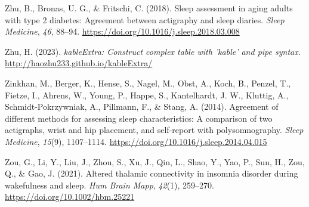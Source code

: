 \documentclass[
]{article}
\newlength{\cslhangindent}
\newenvironment{CSLReferences}[2] %
 {\begin{list}{}{%
  \setlength{\itemindent}{0pt}
  \setlength{\leftmargin}{0pt}
  \setlength{\parsep}{0pt}
  \ifodd #1
   \setlength{\leftmargin}{\cslhangindent}
   \setlength{\itemindent}{-1\cslhangindent}
  \fi
  \setlength{\itemsep}{#2\baselineskip}}}
 {\end{list}}
\begin{document}
\begin{CSLReferences}{1}{0}
Zhu, B., Bronas, U. G., \& Fritschi, C. (2018). Sleep assessment in aging adults with type 2 diabetes: Agreement between actigraphy and sleep diaries. \emph{Sleep Medicine}, \emph{46}, 88--94. \url{https://doi.org/10.1016/j.sleep.2018.03.008}

Zhu, H. (2023). \emph{kableExtra: Construct complex table with 'kable' and pipe syntax}. \url{http://haozhu233.github.io/kableExtra/}

Zinkhan, M., Berger, K., Hense, S., Nagel, M., Obst, A., Koch, B., Penzel, T., Fietze, I., Ahrens, W., Young, P., Happe, S., Kantelhardt, J. W., Kluttig, A., Schmidt-Pokrzywniak, A., Pillmann, F., \& Stang, A. (2014). Agreement of different methods for assessing sleep characteristics: A comparison of two actigraphs, wrist and hip placement, and self-report with polysomnography. \emph{Sleep Medicine}, \emph{15}(9), 1107--1114. \url{https://doi.org/10.1016/j.sleep.2014.04.015}

Zou, G., Li, Y., Liu, J., Zhou, S., Xu, J., Qin, L., Shao, Y., Yao, P., Sun, H., Zou, Q., \& Gao, J. (2021). Altered thalamic connectivity in insomnia disorder during wakefulness and sleep. \emph{Hum Brain Mapp}, \emph{42}(1), 259--270. \url{https://doi.org/10.1002/hbm.25221}

\end{CSLReferences}
\end{document}
